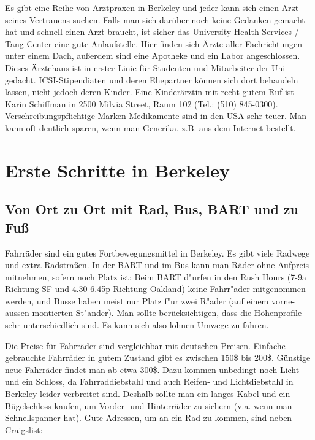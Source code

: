 \documentclass[a4paper]{scrreprt}
\begin{document}
Es gibt eine Reihe von Arztpraxen in Berkeley und jeder kann sich einen Arzt seines Vertrauens suchen. Falls man sich darüber noch keine Gedanken gemacht hat und schnell einen Arzt braucht, ist sicher das University Health Services / Tang Center eine gute Anlaufstelle. Hier finden sich Ärzte aller Fachrichtungen unter einem Dach, außerdem sind eine Apotheke und ein Labor angeschlossen. Dieses Ärztehaus ist in erster Linie für Studenten und Mitarbeiter der Uni gedacht. ICSI-Stipendiaten und deren Ehepartner können sich dort behandeln lassen, nicht jedoch deren Kinder.
Eine Kinderärztin mit recht gutem Ruf ist Karin Schiffman in 2500 Milvia Street, Raum 102 (Tel.: (510) 845-0300). Verschreibungspflichtige Marken-Medikamente sind in den USA sehr teuer. Man kann oft deutlich sparen, wenn man Generika, z.B. aus dem Internet bestellt.
 
\chapter{Erste Schritte in Berkeley}

\section{Von Ort zu Ort mit Rad, Bus, BART und zu Fuß}

Fahrräder sind ein gutes Fortbewegungsmittel in Berkeley. 
Es gibt viele Radwege und extra Radstraßen. 
In der BART und im Bus kann man Räder ohne Aufpreis mitnehmen, sofern noch Platz ist: Beim BART d"urfen in den Rush Hours (7-9a Richtung SF und 4.30-6.45p Richtung Oakland) keine Fahrr"ader mitgenommen werden, und Busse haben meist nur Platz f"ur zwei R"ader (auf einem vorne-aussen montierten St"ander).
Man sollte berücksichtigen, dass die Höhenprofile sehr unterschiedlich sind. 
Es kann sich also lohnen Umwege zu fahren.

Die Preise für Fahrräder sind vergleichbar mit deutschen Preisen. 
Einfache gebrauchte Fahrräder in gutem Zustand gibt es zwischen 150\$ bis 200\$. 
Günstige neue Fahrräder findet man ab etwa 300\$. 
Dazu kommen unbedingt noch Licht und ein Schloss, da Fahrraddiebstahl und auch Reifen- und Lichtdiebstahl in Berkeley leider verbreitet sind. 
Deshalb sollte man ein langes Kabel und ein Bügelschloss kaufen, um Vorder- und Hinterräder zu sichern (v.a. wenn man Schnellspanner hat). 
Gute Adressen, um an ein Rad zu kommen, sind neben Craigslist:
\end{document}
